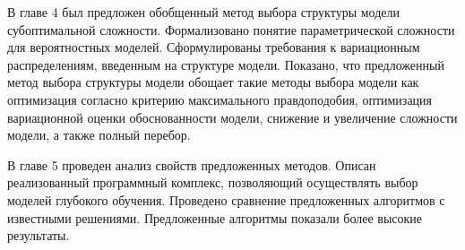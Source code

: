 В главе 4 был предложен обобщенный метод выбора структуры модели субоптимальной сложности. Формализовано понятие параметрической сложности для вероятностных моделей. Сформулированы требования к вариационным распределениям, введенным на структуре модели. Показано, что предложенный метод выбора структуры модели обощает такие методы выбора модели как оптимизация согласно критерию максимального правдоподобия, оптимизация вариационной оценки обоснованности модели, снижение и увеличение сложности модели, а также полный перебор.

В главе 5 проведен анализ свойств предложенных методов. Описан реализованный программный комплекс, позволяющий осуществлять выбор моделей глубокого обучения. Проведено сравнение предложенных алгоритмов с известными решениями. Предложенные алгоритмы показали более высокие результаты. 

